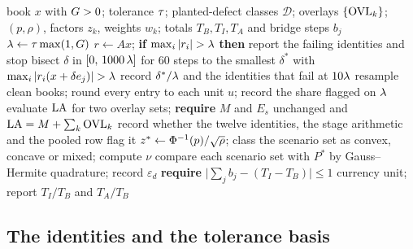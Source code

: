\begin{algorithm}[htbp]
\caption{The acceptance protocol for one reporting date. The input is a book $x$ of tables, the overlays, the scenario factors with weights and the totals of the three regimes; every threshold is stated before the run.}
\label{alg:protocol}
\begin{algorithmic}[1]
\Require book $x$ with $G>0$; tolerance $\tau$; planted-defect classes $\mathcal{D}$; overlays $\{\mathrm{OVL}_k\}$; $(p,\rho)$, factors $z_k$, weights $w_k$; totals $T_B,T_I,T_A$ and bridge steps $b_j$
\State $\lambda \gets \tau\max(1,G)$ 
\State $r \gets Ax$; \textbf{if} $\max_i|r_i|>\tlim$ \textbf{then} report the failing identities and stop
  \State bisect $\delta$ in $[0,\,1000\,\lambda]$ for 60 steps to the smallest $\delta^{*}$ with $\max_i|r_i(x+\delta e_j)|>\tlim$
  \State record $\delta^{*}/\lambda$ and the identities that fail at $10\lambda$
\EndFor
\State resample clean books; round every entry to each unit $u$; record the share flagged on $\lambda$
\State evaluate $\mathrm{LA}$ for two overlay sets; \textbf{require} $M$ and $E_s$ unchanged and $\mathrm{LA}=M+\sum_k\mathrm{OVL}_k$
  \State record whether the twelve identities, the stage arithmetic and the pooled row flag it
\EndFor
\State $z^{*}\gets\Phi^{-1}(p)/\sqrt{\rho}$; class the scenario set as convex, concave or mixed; compute $\nu$
\State compare each scenario set with $P^{*}$ by Gauss--Hermite quadrature; record $\varepsilon_d$
\State \textbf{require} $\big|\sum_j b_j-(T_I-T_B)\big|\le 1$ currency unit; report $T_I/T_B$ and $T_A/T_B$
\end{algorithmic}
\end{algorithm}

\subsection{The identities and the tolerance basis}
\label{sec:method-identities}

